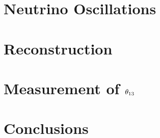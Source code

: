 \documentclass{ucbthesis}
\begin{document}
\listoftodos

\chapter{Neutrino Oscillations}





\chapter{Reconstruction}




\chapter{Measurement of \texorpdfstring{$\theta_{13}$}{theta13}}

\chapter{Conclusions}

\printbibliography

\appendix


\end{document}
